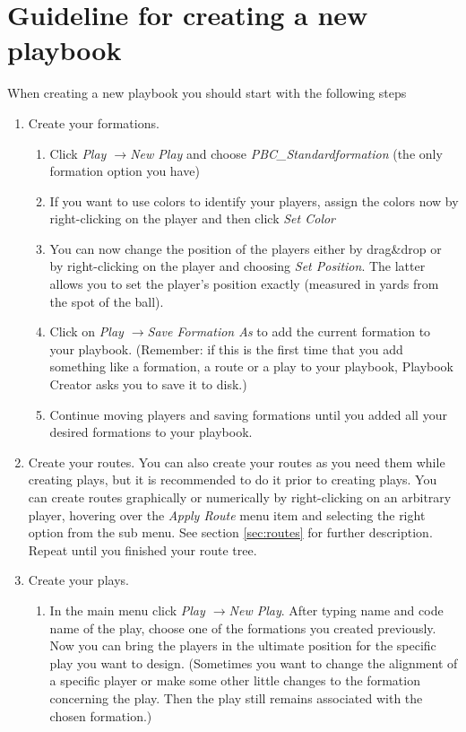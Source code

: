\documentclass[10pt,a4paper]{article}
\newcommand{\pfeil}{$\rightarrow$}
\begin{document}
	\section{Guideline for creating a new playbook}
	\label{sec:guideline}
		When creating a new playbook you should start with the following steps
		\begin{enumerate}
			\item Create your formations.
				\begin{enumerate}
					\item Click \textit{Play \pfeil New Play} and choose \textit{PBC\_Standardformation} (the only formation option you have)
					
					\item If you want to use colors to identify your players, assign the colors now by right-clicking on the player and then click \textit{Set Color}
					
					\item You can now change the position of the players either by drag\&drop or by right-clicking on the player and choosing \textit{Set Position}. The latter allows you to set the player's position exactly (measured in yards from the spot of the ball).
					
					\item Click on \textit{Play \pfeil Save Formation As} to add the current formation to your playbook. (Remember: if this is the first time that you add something like a formation, a route or a play to your playbook, Playbook Creator asks you to save it to disk.)
					
					\item Continue moving players and saving formations until you added all your desired formations to your playbook.
				\end{enumerate}
			\item Create your routes. You can also create your routes as you need them while creating plays, but it is recommended to do it prior to creating plays. You can create routes graphically or numerically by right-clicking on an arbitrary player, hovering over the \textit{Apply Route} menu item and selecting the right option from the sub menu. See section \ref{sec:routes} for further description. Repeat until you finished your route tree.
			
			\item Create your plays.
				\begin{enumerate}
					\item In the main menu click \textit{Play \pfeil New Play}. After typing name and code name of the play, choose one of the formations you created previously. Now you can bring the players in the ultimate position for the specific play you want to design. (Sometimes you want to change the alignment of a specific player or make some other little changes to the formation concerning the play. Then the play still remains associated with the chosen formation.)
					

\end{enumerate}
\end{enumerate}
\end{document}
